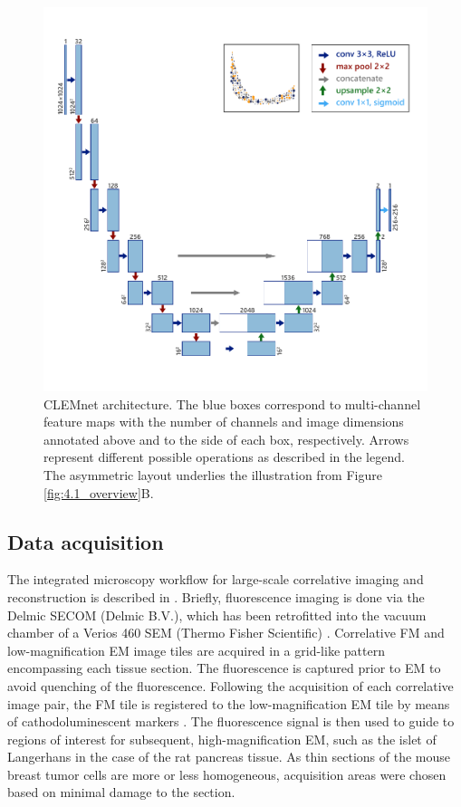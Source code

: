 \begin{figure}[!tb]
    \centering
    \includegraphics[width=0.95\linewidth]{chapter-4/figures_PDF/fig4-M1_architecture.pdf}
    \caption{CLEMnet architecture.
    The blue boxes correspond to multi-channel feature maps with the number of channels and image dimensions annotated above and to the side of each box, respectively. Arrows represent different possible operations as described in the legend. The asymmetric layout underlies the illustration from Figure \ref{fig:4.1_overview}B.}
    \label{fig:4M_architecture}
\end{figure}


\subsection{Data acquisition}
\label{sec:4methods_acquisition}
The integrated microscopy workflow for large-scale correlative imaging and reconstruction is described in \textcite{lane2022integrated}. Briefly, fluorescence imaging is done via the Delmic SECOM (Delmic B.V.), which has been retrofitted into the vacuum chamber of a Verios 460 SEM (Thermo Fisher Scientific) \cite{liv2013simultaneous, zonnevylle2013integration}. Correlative FM and low-magnification EM image tiles are acquired in a grid-like pattern encompassing each tissue section. The fluorescence is captured prior to EM to avoid quenching of the fluorescence. Following the acquisition of each correlative image pair, the FM tile is registered to the low-magnification EM tile by means of cathodoluminescent markers \cite{haring2017automated}. The fluorescence signal is then used to guide to regions of interest for subsequent, high-magnification EM, such as the islet of Langerhans in the case of the rat pancreas tissue. As thin sections of the mouse breast tumor cells are more or less homogeneous, acquisition areas were chosen based on minimal damage to the section. 

